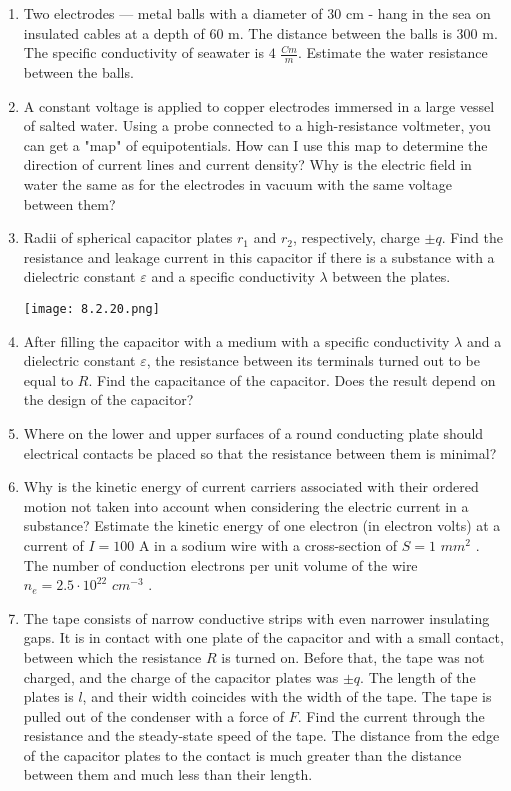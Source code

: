 \documentclass{article}
\begin{document}
\begin{enumerate}[label=8.2.\arabic*]
\item Two electrodes — metal balls with a diameter of $30$ cm - hang in the sea on insulated cables at a depth of $60$ m. The distance between the balls is $300$ m. The specific conductivity of seawater is $4$ $\frac{Cm}{m}$. Estimate the water resistance between the balls.

\item A constant voltage is applied to copper electrodes immersed in a large vessel of salted water. Using a probe connected to a high-resistance voltmeter, you can get a "map" of equipotentials. How can I use this map to determine the direction of current lines and current density? Why is the electric field in water the same as for the electrodes in vacuum with the same voltage between them?

\item Radii of spherical capacitor plates $r_1$ and $r_2$, respectively, charge $\pm q$. Find the resistance and leakage current in this capacitor if there is a substance with a dielectric constant $\varepsilon$ and a specific conductivity $\lambda$ between the plates.

\begin{center}
    \texttt{[image: 8.2.20.png]}
\end{center}

\item After filling the capacitor with a medium with a specific conductivity $\lambda$ and a dielectric constant $\varepsilon$, the resistance between its terminals turned out to be equal to $R$. Find the capacitance of the capacitor. Does the result depend on the design of the capacitor?

\item Where on the lower and upper surfaces of a round conducting plate should electrical contacts be placed so that the resistance between them is minimal?

\item Why is the kinetic energy of current carriers associated with their ordered motion not taken into account when considering the electric current in a substance? Estimate the kinetic energy of one electron (in electron volts) at a current of $I = 100$ A in a sodium wire with a cross-section of $S = 1$ $mm^2$ . The number of conduction electrons per unit volume of the wire $n_e = 2.5 \cdot 10^{22}$ $cm^{-3}$ .

\item The tape consists of narrow conductive strips with even narrower insulating gaps. It is in contact with one plate of the capacitor and with a small contact, between which the resistance $R$ is turned on. Before that, the tape was not charged, and the charge of the capacitor plates was $\pm q$. The length of the plates is $l$, and their width coincides with the width of the tape. The tape is pulled out of the condenser with a force of $F$. Find the current through the resistance and the steady-state speed of the tape. The distance from the edge of the capacitor plates to the contact is much greater than the distance between them and much less than their length.


\end{enumerate}
\end{document}
